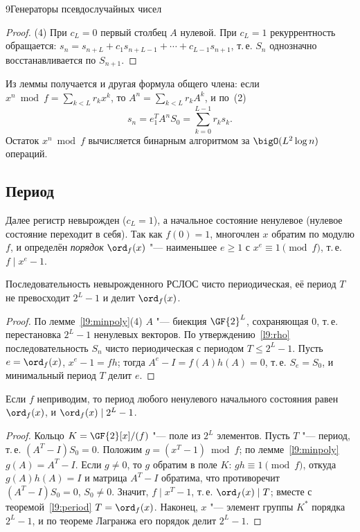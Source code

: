 \begin{lecture}{9}{Генераторы псевдослучайных чисел}
\begin{proof}
(4) При $c_L = 0$ первый столбец $A$ нулевой. При $c_L = 1$ рекуррентность обращается:
$s_n = s_{n+L} + c_1 s_{n+L-1} + \cdots + c_{L-1} s_{n+1}$, т.\,е. $S_n$ однозначно восстанавливается
по $S_{n+1}$.
\end{proof}

Из леммы получается и другая формула общего члена: если $x^n \bmod f = \sum_{k<L} r_k x^k$, то
$A^n = \sum_{k<L} r_k A^k$, и по~(2)
\[
  s_n = e_1^T A^n S_0 = \sum_{k=0}^{L-1} r_k s_k .
\]
Остаток $x^n \bmod f$ вычисляется бинарным алгоритмом за $\bigO(L^2 \log n)$ операций.


\subsection{Период}

Далее регистр невырожден ($c_L = 1$), а начальное состояние ненулевое (нулевое состояние
переходит в себя). Так как $f(0) = 1$, многочлен $x$ обратим по модулю $f$, и определён
\emph{порядок} $\ord_f(x)$ "--- наименьшее $e \ge 1$ с $x^e \equiv 1 \pmod f$, т.\,е. $f \mid x^e - 1$.

\begin{theorem}\label{l9:period}
Последовательность невырожденного РСЛОС чисто периодическая, её период $T$ не превосходит
$2^L - 1$ и делит $\ord_f(x)$.
\end{theorem}

\begin{proof}
По лемме~\ref{l9:minpoly}(4) $A$ "--- биекция $\GF{2}^L$, сохраняющая $0$, т.\,е. перестановка
$2^L - 1$ ненулевых векторов. По утверждению~\ref{l9:rho} последовательность $S_n$ чисто
периодическая с периодом $T \le 2^L - 1$. Пусть $e = \ord_f(x)$, $x^e - 1 = f h$; тогда
$A^e - I = f(A) h(A) = 0$, т.\,е. $S_e = S_0$, и минимальный период $T$ делит $e$.
\end{proof}

\begin{theorem}\label{l9:irred}
Если $f$ неприводим, то период любого ненулевого начального состояния равен $\ord_f(x)$, и
$\ord_f(x) \mid 2^L - 1$.
\end{theorem}

\begin{proof}
Кольцо $K = \GF{2}[x]/(f)$ "--- поле из $2^L$ элементов. Пусть $T$ "--- период, т.\,е.
$(A^T - I) S_0 = 0$. Положим $g = (x^T - 1) \bmod f$; по лемме~\ref{l9:minpoly} $g(A) = A^T - I$.
Если $g \ne 0$, то $g$ обратим в поле $K$: $gh \equiv 1 \pmod f$, откуда $g(A) h(A) = I$ и
матрица $A^T - I$ обратима, что противоречит $(A^T - I) S_0 = 0$, $S_0 \ne 0$. Значит,
$f \mid x^T - 1$, т.\,е. $\ord_f(x) \mid T$; вместе с теоремой~\ref{l9:period} $T = \ord_f(x)$.
Наконец, $x$ "--- элемент группы $K^*$ порядка $2^L - 1$, и по теореме Лагранжа его порядок делит
$2^L - 1$.
\end{proof}


\end{lecture}
